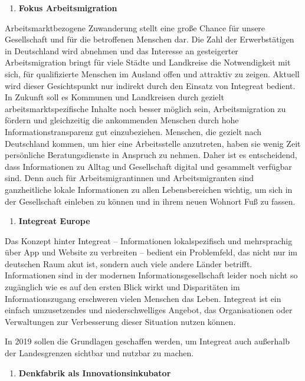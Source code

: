 \documentclass[12pt, a4paper]{article} %
\begin{document}
\begin{enumerate}
\def\labelenumi{\arabic{enumi}.}
\setcounter{enumi}{1}
\item
\textbf{Fokus Arbeitsmigration}
\end{enumerate}

Arbeitsmarktbezogene Zuwanderung stellt eine große Chance für unsere
Gesellschaft und für die betroffenen Menschen dar. Die Zahl der
Erwerbstätigen in Deutschland wird abnehmen und das Interesse an
gesteigerter Arbeitsmigration bringt für viele Städte und Landkreise die
Notwendigkeit mit sich, für qualifizierte Menschen im Ausland offen und
attraktiv zu zeigen. Aktuell wird dieser Gesichtspunkt nur indirekt
durch den Einsatz von Integreat bedient. In Zukunft soll es Kommunen und
Landkreisen durch gezielt arbeitsmarktspezifische Inhalte noch besser
möglich sein, Arbeitsmigration zu fördern und gleichzeitig die
ankommenden Menschen durch hohe Informationstransparenz gut
einzubeziehen. Menschen, die gezielt nach Deutschland kommen, um hier
eine Arbeitsstelle anzutreten, haben sie wenig Zeit persönliche
Beratungsdienste in Anspruch zu nehmen. Daher ist es entscheidend, dass
Informationen zu Alltag und Gesellschaft digital und gesammelt verfügbar
sind. Denn auch für Arbeitsmigrantinnen und Arbeitsmigranten sind
ganzheitliche lokale Informationen zu allen Lebensbereichen wichtig, um
sich in der Gesellschaft einleben zu können und in ihrem neuen Wohnort
Fuß zu fassen.

\begin{enumerate}
\def\labelenumi{\arabic{enumi}.}
\setcounter{enumi}{2}
\item
\textbf{Integreat Europe}
\end{enumerate}

Das Konzept hinter Integreat – Informationen lokalspezifisch und
mehrsprachig über App und Website zu verbreiten – bedient ein
Problemfeld, das nicht nur im deutschen Raum akut ist, sondern auch
viele andere Länder betrifft. Informationen sind in der modernen
Informationsgesellschaft leider noch nicht so zugänglich wie es auf den
ersten Blick wirkt und Disparitäten im Informationszugang erschweren
vielen Menschen das Leben. Integreat ist ein einfach umzusetzendes und
niederschwelliges Angebot, das Organisationen oder Verwaltungen zur
Verbesserung dieser Situation nutzen können.

In 2019 sollen die Grundlagen geschaffen werden, um Integreat auch
außerhalb der Landesgrenzen sichtbar und nutzbar zu machen.

\begin{enumerate}
\def\labelenumi{\arabic{enumi}.}
\setcounter{enumi}{3}
\item
\textbf{Denkfabrik als Innovationsinkubator}
\end{enumerate}
\end{document}
